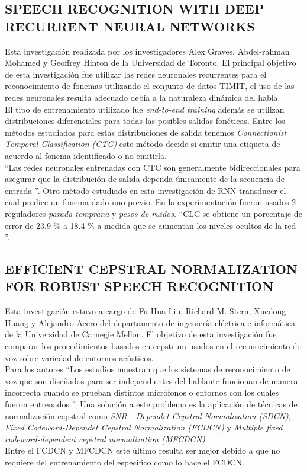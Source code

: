 \subsection{SPEECH RECOGNITION WITH DEEP RECURRENT NEURAL NETWORKS}
Esta investigación realizada por los investigadores Alex Graves, Abdel-rahman Mohamed y Geoffrey Hinton de la Universidad de Toronto. El principal objetivo de esta investigación fue utilizar las redes neuronales recurrentes para el reconocimiento de fonemas utilizando el conjunto de datos TIMIT, el uso de las redes neuronales resulta adecuado debía a la naturaleza dinámica del habla.\\ El tipo de entrenamiento utilizado fue \textit{ end-to-end training} además se utilizan distribuciones diferenciales para todas las posibles salidas fonéticas. Entre los métodos estudiados para estas distribuciones de salida tenemos \textit{Connectionist Temporal Classification (CTC)} este método decide si emitir una etiqueta de acuerdo al fonema identificado o no emitirla.\\  \textquotedblleft Las redes neuronales entrenadas con CTC son generalmente bidireccionales para asegurar que la distribución de salida dependa únicamente de la secuencia de entrada \textquotedblright. Otro método estudiado en esta investigación de RNN transducer el cual predice un fonema dado uno previo. En la experimentación fueron usados 2 reguladores \textit{parada temprana} y \textit{pesos de ruidos}. \textquotedblleft CLC se obtiene un porcentaje de error de 23.9 \% a 18.4 \% a medida que se aumentan los niveles ocultos de la red \textquotedblright.

\subsection{EFFICIENT CEPSTRAL NORMALIZATION FOR ROBUST SPEECH RECOGNITION}
Esta investigación estuvo a cargo de Fu-Hua Liu, Richard M. Stern, Xuedong Huang y Alejandro Acero del departamento de ingeniería eléctrica e informática de la Universidad de Carnegie Mellon. El objetivo de esta investigación fue comparar los procedimientos basados en cepstrum usados en el reconocimiento de voz sobre variedad de entornos acústicos.\\ Para los autores \textquotedblleft Los estudios muestran que los sistemas de reconocimiento de voz que son diseñados para ser independientes del hablante funcionan de manera incorrecta cuando se prueban distintos micrófonos o entornos con los cuales fueron entrenados \textquotedblright. Una solución a este problema es la aplicación de técnicas de normalización cepstral como \textit{ SNR - Dependet Cepstral Normalization (SDCN)}, \textit{Fixed Codeword-Dependet Cepstral Normalization (FCDCN)} y \textit{ Multiple fixed codeword-dependent cepstral normalization (MFCDCN)}.\\ Entre el FCDCN y MFCDCN este último resulta ser mejor debido a que no requiere del entrenamiento del especifico como lo hace el FCDCN.

